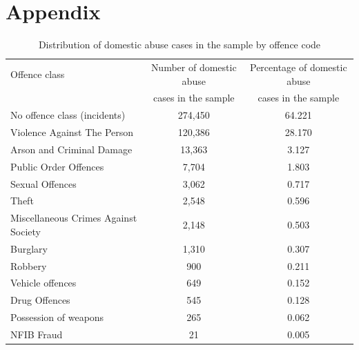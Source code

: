 \documentclass[12pt, a4paper]{article}
\begin{document}
\clearpage

\newpage


\clearpage



\section*{Appendix}

\renewcommand{\thetable}{S\arabic{table}}
\renewcommand{\thefigure}{S\arabic{figure}}
\setcounter{table}{0}
\setcounter{figure}{0}



\begin{table}[ht]
\caption{Distribution of domestic abuse cases in the sample by offence code}
\label{crimetypes}
\centering
\begin{tabular}{lcc}
  \hline
Offence class & Number of domestic abuse & Percentage of domestic abuse \\ 
 & cases in the sample & cases in the sample \\
  \hline
  No offence class (incidents) & 274,450 & 64.221 \\ 
  Violence Against The Person & 120,386 & 28.170 \\ 
  Arson and Criminal Damage & 13,363 & 3.127 \\ 
  Public Order Offences & 7,704 & 1.803 \\ 
  Sexual Offences & 3,062 & 0.717 \\ 
  Theft & 2,548 & 0.596 \\ 
  Miscellaneous Crimes Against Society & 2,148 & 0.503 \\ 
  Burglary & 1,310 & 0.307 \\ 
  Robbery &  900 & 0.211 \\ 
  Vehicle offences &  649 & 0.152 \\ 
  Drug Offences &  545 & 0.128 \\ 
  Possession of weapons &  265 & 0.062 \\ 
  NFIB Fraud &   21 & 0.005 \\ 
   \hline
\end{tabular}
\end{table}
\end{document}
